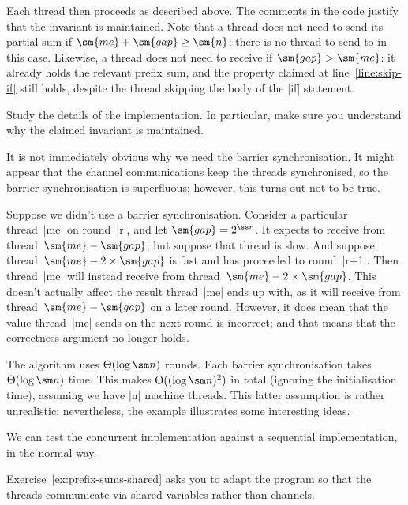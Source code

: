 
Each thread then proceeds as described above.  The comments in the code
justify that the invariant is maintained.  Note that a thread does not need to
send its partial sum if $\sm{me}+\sm{gap} \ge \sm{n}$: there is no thread to
send to in this case.  Likewise, a thread does not need to receive if
$\sm{gap} > \sm{me}$: it already holds the relevant prefix sum, and the
property claimed at line~\ref{line:skip-if} still holds, despite the thread
skipping the body of the |if| statement.

\begin{instruction}
Study the details of the implementation.  In particular, make sure you
understand why the claimed invariant is maintained.
\end{instruction}

It is not immediately obvious why we need the barrier synchronisation.  It
might appear that the channel communications keep the threads synchronised, so
the barrier synchronisation is superfluous; however, this turns out not to be
true.  

Suppose we didn't use a barrier synchronisation.  Consider a particular
thread~|me| on round~|r|, and let $\sm{gap} = 2^{\ss r}$.  It expects to
receive from thread~$\sm{me}-\sm{gap}$; but suppose that thread is slow.  And
suppose thread~$\sm{me}-2 \times\sm{gap}$ is fast and has proceeded to
round~|r+1|.  Then thread~|me| will instead receive from thread~$\sm{me}-2
\times\sm{gap}$.  This doesn't actually affect the result thread~|me| ends up
with, as it will receive from thread~$\sm{me}-\sm{gap}$ on a later round.
However, it does mean that the value thread~|me| sends on the next round is
incorrect; and that means that the correctness argument no longer holds.  

The algorithm uses $\Theta(\log \sm n)$ rounds.  Each barrier synchronisation
takes $\Theta(\log \sm n)$ time.  This makes $\Theta((\log \sm n)^2)$ in total
(ignoring the initialisation time), assuming we have |n| machine threads.
This latter assumption is rather unrealistic; nevertheless, the example
illustrates some interesting ideas.

We can test the concurrent implementation against a sequential implementation,
in the normal way. 

Exercise~\ref{ex:prefix-sums-shared} asks you to adapt the program so that the
threads communicate via shared variables rather than channels.


